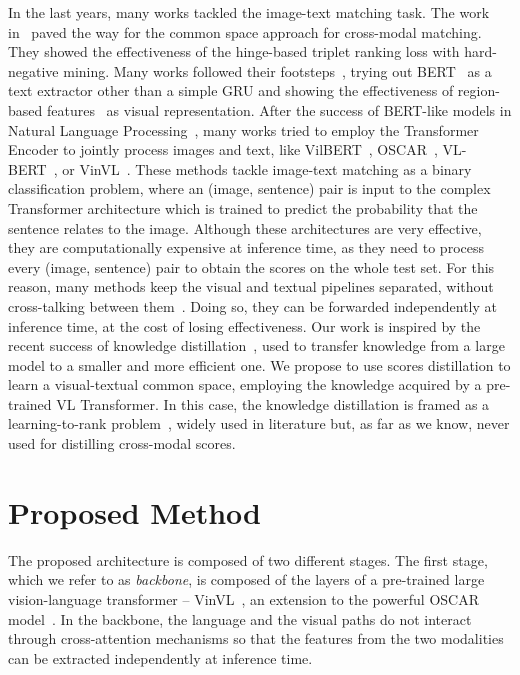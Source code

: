 \documentclass[sigconf]{acmart}
\begin{document}
In the last years, many works tackled the image-text matching task. The work in~\citep{vsepp2018faghri} paved the way for the common space approach for cross-modal matching. They showed the effectiveness of the hinge-based triplet ranking loss with hard-negative mining. Many works followed their footsteps~\citep{messina2021fine, messina2021transformer,li2019,stefanini2021novel,qu2020context,wen2020learning}, trying out BERT~\citep{devlin2019bert} as a text extractor other than a simple GRU and showing the effectiveness of region-based features~\citep{Anderson2018bottomup} as visual representation. After the success of BERT-like models in Natural Language Processing~\citep{devlin2019bert,lewis2019bart,liu2019roberta}, many works tried to employ the Transformer Encoder to jointly process images and text, like VilBERT~\citep{lu2019vilbert}, OSCAR~\citep{li2020oscar}, VL-BERT~\citep{Su2020VL-BERT}, or VinVL~\citep{zhang2021vinvl}. These methods tackle image-text matching as a binary classification problem, where an (image, sentence) pair is input to the complex Transformer architecture which is trained to predict the probability that the sentence relates to the image. Although these architectures are very effective, they are computationally expensive at inference time, as they need to process every (image, sentence) pair to obtain the scores on the whole test set. For this reason, many methods keep the visual and textual pipelines separated, without cross-talking between them~\citep{messina2021fine,messina2021transformer,huang2018image,sarafianos2019adversarial,wen2020learning}. Doing so, they can be forwarded independently at inference time, at the cost of losing effectiveness. Our work is inspired by the recent success of knowledge distillation~\citep{anil2018large,barraco2022camel,caron2021emerging,xie2020self,zhou2020more}, used to transfer knowledge from a large model to a smaller and more efficient one. We propose to use scores distillation to learn a visual-textual common space, employing the knowledge acquired by a pre-trained VL Transformer. In this case, the knowledge distillation is framed as a learning-to-rank problem~\citep{cao2007learning,pobrotyn2020context,bruch2021alternative}, widely used in literature but, as far as we know, never used for distilling cross-modal scores.
 \section{Proposed Method}
\label{sec:method}
The proposed architecture is composed of two different stages.
The first stage, which we refer to as \textit{backbone}, is composed of the layers of a pre-trained large vision-language transformer -- VinVL~\citep{zhang2021vinvl}, an extension to the powerful OSCAR model~\citep{li2020oscar}. In the backbone, the language and the visual paths do not interact through cross-attention mechanisms so that the features from the two modalities can be extracted independently at inference time.
\end{document}
